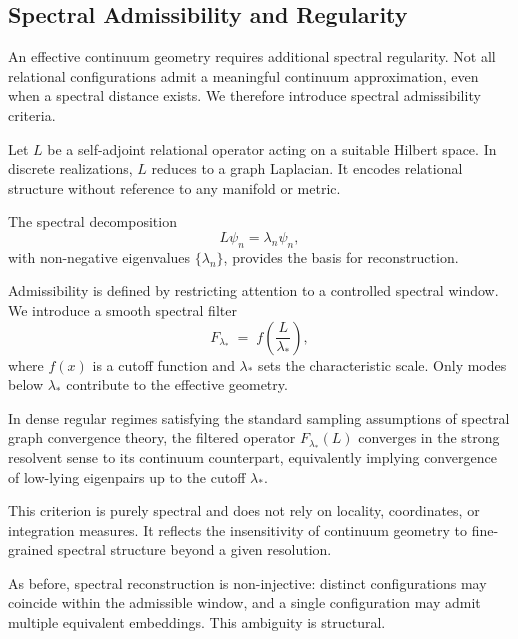 \subsection{Spectral Admissibility and Regularity}
  \label{subsec:spectral-admissibility}

  An effective continuum geometry requires additional spectral regularity.
  Not all relational configurations admit a meaningful continuum approximation,
  even when a spectral distance exists.
  We therefore introduce spectral admissibility criteria.

  Let $L$ be a self-adjoint relational operator acting on a suitable Hilbert space.
  In discrete realizations, $L$ reduces to a graph Laplacian.
  It encodes relational structure without reference to any manifold or metric.

  The spectral decomposition
  \begin{equation}
    L \psi_n = \lambda_n \psi_n ,
  \end{equation}
  with non-negative eigenvalues $\{\lambda_n\}$,
  provides the basis for reconstruction.

  Admissibility is defined by restricting attention to a controlled spectral window.
  We introduce a smooth spectral filter
  \begin{equation}
    F_{\lambda_*} \;=\; f\!\left(\frac{L}{\lambda_*}\right),
  \end{equation}
  where $f(x)$ is a cutoff function and $\lambda_*$ sets the characteristic scale.
  Only modes below $\lambda_*$ contribute to the effective geometry.

  In dense regular regimes satisfying the standard sampling assumptions of
  spectral graph convergence theory, the filtered operator $F_{\lambda_*}(L)$
  converges in the strong resolvent sense to its continuum counterpart,
  equivalently implying convergence of low-lying eigenpairs up to the cutoff $\lambda_*$.

  This criterion is purely spectral and does not rely on locality,
  coordinates, or integration measures.
  It reflects the insensitivity of continuum geometry to
  fine-grained spectral structure beyond a given resolution.

  As before, spectral reconstruction is non-injective:
  distinct configurations may coincide within the admissible window,
  and a single configuration may admit multiple equivalent embeddings.
  This ambiguity is structural.
